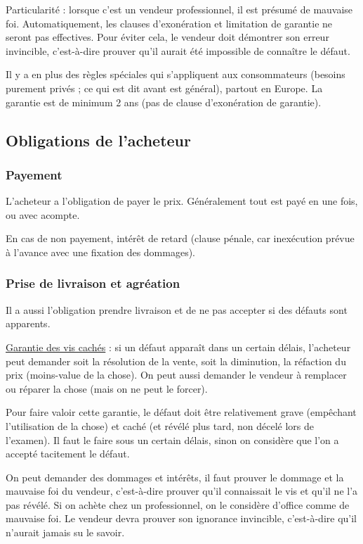 			Particularité : lorsque c'est un vendeur professionnel, il est présumé de mauvaise foi. Automatiquement, les clauses d'exonération et limitation de garantie ne seront pas effectives. Pour éviter cela, le vendeur doit démontrer son erreur invincible, c'est-à-dire prouver qu'il aurait été impossible de connaître le défaut.
		
			Il y a en plus des règles spéciales qui s'appliquent aux consommateurs (besoins purement privés ; ce qui est dit avant est général), partout en Europe. La garantie est de minimum 2 ans (pas de clause d'exonération de garantie).
		
	
	\subsection{Obligations de l'acheteur}
		
		\subsubsection{Payement}
		L'acheteur a l'obligation de payer le prix. Généralement tout est payé en une fois, ou avec acompte.
	
		En cas de non payement, intérêt de retard (clause pénale, car inexécution prévue à l'avance avec une fixation des dommages).
	
		\subsubsection{Prise de livraison et agréation}
		
	Il a aussi l'obligation prendre livraison et de ne pas accepter si des défauts sont apparents.
	
	
	
	\underline{Garantie des vis cachés} : si un défaut apparaît dans un certain délais, l'acheteur peut demander soit la résolution de la vente, soit la diminution, la réfaction du prix (moins-value de la chose). On peut aussi demander le vendeur à remplacer ou réparer la chose (mais on ne peut le forcer).
	
	Pour faire valoir cette garantie, le défaut doit être relativement grave (empêchant l'utilisation de la chose) et caché (et révélé plus tard, non décelé lors de l'examen). Il faut le faire sous un certain délais, sinon on considère que l'on a accepté tacitement le défaut.
	
	On peut demander des dommages et intérêts, il faut prouver le dommage et la mauvaise foi du vendeur, c'est-à-dire prouver qu'il connaissait le vis et qu'il ne l'a pas révélé. Si on achète chez un professionnel, on le considère d'office comme de mauvaise foi. Le vendeur devra prouver son ignorance invincible, c'est-à-dire qu'il n'aurait jamais su le savoir.
	
